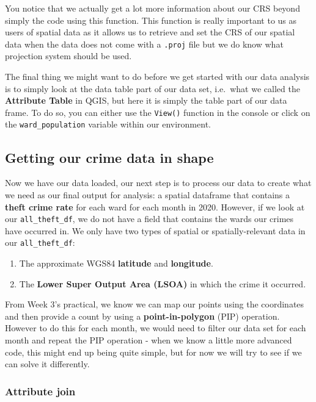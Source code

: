 \documentclass[
]{book}
\providecommand{\tightlist}{%
  \setlength{\itemsep}{0pt}\setlength{\parskip}{0pt}}
\begin{document}
You notice that we actually get a lot more information about our CRS beyond simply the code using this function. This function is really important to us as users of spatial data as it allows us to retrieve and set the CRS of our spatial data when the data does not come with a \texttt{.proj} file but we do know what projection system should be used.

The final thing we might want to do before we get started with our data analysis is to simply look at the data table part of our data set, i.e.~what we called the \textbf{Attribute Table} in QGIS, but here it is simply the table part of our data frame. To do so, you can either use the \texttt{View()} function in the console or click on the \texttt{ward\_population} variable within our environment.

\hypertarget{getting-our-crime-data-in-shape}{%
\subsection{Getting our crime data in shape}\label{getting-our-crime-data-in-shape}}

Now we have our data loaded, our next step is to process our data to create what we need as our final output for analysis: a spatial dataframe that contains a \textbf{theft crime rate} for each ward for each month in 2020. However, if we look at our \texttt{all\_theft\_df}, we do not have a field that contains the wards our crimes have occurred in. We only have two types of spatial or spatially-relevant data in our \texttt{all\_theft\_df}:

\begin{enumerate}
\def\labelenumi{\arabic{enumi})}
\tightlist
\item
  The approximate WGS84 \textbf{latitude} and \textbf{longitude}.
\item
  The \textbf{Lower Super Output Area (LSOA)} in which the crime it occurred.
\end{enumerate}

From Week 3's practical, we know we can map our points using the coordinates and then provide a count by using a \textbf{point-in-polygon} (PIP) operation. However to do this for each month, we would need to filter our data set for each month and repeat the PIP operation - when we know a little more advanced code, this might end up being quite simple, but for now we will try to see if we can solve it differently.

\hypertarget{attribute-join}{%
\subsubsection{Attribute join}\label{attribute-join}}
\end{document}
